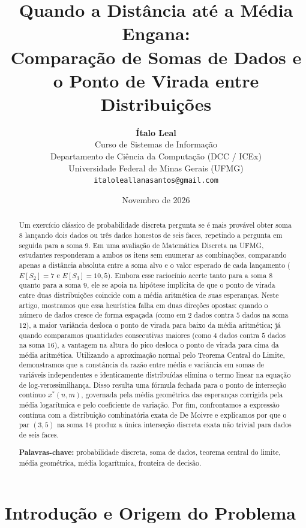 \documentclass[11pt,a4paper]{article}
\title{\textbf{Quando a Distância até a Média Engana:\\Comparação de Somas de Dados e o Ponto de Virada entre Distribuições}}
\author{
    \textbf{Ítalo Leal}\\
    {\small Curso de Sistemas de Informação}\\
    {\small Departamento de Ciência da Computação (DCC / ICEx)}\\
    {\small Universidade Federal de Minas Gerais (UFMG)}\\
    {\small \texttt{italoleallanasantos@gmail.com}}
}
\date{Novembro de 2026}
\theoremstyle{definition}
\theoremstyle{remark}
\begin{document}
\maketitle

\begin{abstract}
\noindent
Um exercício clássico de probabilidade discreta pergunta se é mais provável obter soma $8$ lançando dois dados ou três dados honestos de seis faces, repetindo a pergunta em seguida para a soma $9$. Em uma avaliação de Matemática Discreta na UFMG, estudantes responderam a ambos os itens sem enumerar as combinações, comparando apenas a distância absoluta entre a soma alvo e o valor esperado de cada lançamento ($E[S_2] = 7$ e $E[S_3] = 10{,}5$). Embora esse raciocínio acerte tanto para a soma $8$ quanto para a soma $9$, ele se apoia na hipótese implícita de que o ponto de virada entre duas distribuições coincide com a média aritmética de suas esperanças. Neste artigo, mostramos que essa heurística falha em duas direções opostas: quando o número de dados cresce de forma espaçada (como em $2$ dados contra $5$ dados na soma $12$), a maior variância desloca o ponto de virada para baixo da média aritmética; já quando comparamos quantidades consecutivas maiores (como $4$ dados contra $5$ dados na soma $16$), a vantagem na altura do pico desloca o ponto de virada para cima da média aritmética. Utilizando a aproximação normal pelo Teorema Central do Limite, demonstramos que a constância da razão entre média e variância em somas de variáveis independentes e identicamente distribuídas elimina o termo linear na equação de log-verossimilhança. Disso resulta uma fórmula fechada para o ponto de interseção contínuo $x^*(n,m)$, governada pela média geométrica das esperanças corrigida pela média logarítmica e pelo coeficiente de variação. Por fim, confrontamos a expressão contínua com a distribuição combinatória exata de De Moivre e explicamos por que o par $(3,5)$ na soma $14$ produz a única interseção discreta exata não trivial para dados de seis faces.

\vspace{0.5em}
\noindent\textbf{Palavras-chave:} probabilidade discreta, soma de dados, teorema central do limite, média geométrica, média logarítmica, fronteira de decisão.
\end{abstract}

\section{Introdução e Origem do Problema}
\end{document}
